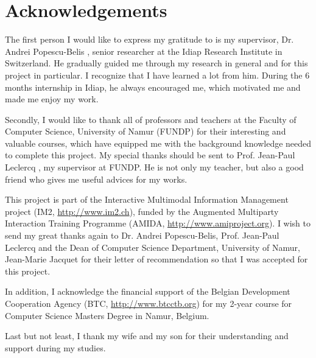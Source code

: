 


\chapter*{Acknowledgements}      %
\small

The first person I would like to express my gratitude to is my supervisor, Dr. Andrei Popescu-Belis \cite{Andrei}, senior researcher at the Idiap Research Institute in Switzerland. He gradually guided me through my research in general and for this project in particular. I recognize that I have learned a lot from him. During the 6 months internship in Idiap, he always encouraged me, which motivated me and made me enjoy my work. 

Secondly, I would like to thank all of professors and teachers at the Faculty of Computer Science, University of Namur (FUNDP) for their interesting and valuable courses, which have equipped me with the background knowledge needed to complete this project. My special thanks should be sent to Prof. Jean-Paul Leclercq \cite{Paul}, my supervisor at FUNDP. He is not only my teacher, but also a good friend who gives me useful advices for my works. 

This project is part of the Interactive Multimodal Information Management project (IM2, \url{http://www.im2.ch}), funded by the Augmented Multiparty Interaction Training Programme (AMIDA, \url{http://www.amiproject.org}). I wish to send my great thanks again to Dr. Andrei Popescu-Belis, Prof. Jean-Paul Leclercq and the Dean of Computer Science Department, University of Namur, Jean-Marie Jacquet \cite{Jacquet} for their letter of recommendation so that I was accepted for this project.

In addition, I acknowledge the financial support of the Belgian Development Cooperation Agency (BTC, \url{http://www.btcctb.org}) for my 2-year course for Computer Science Masters Degree in Namur, Belgium.

Last but not least, I thank my wife and my son for their understanding and support during my studies. %

\normalsize



